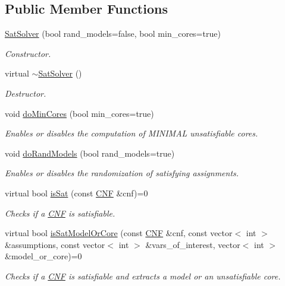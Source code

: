 \subsection*{Public Member Functions}
\begin{DoxyCompactItemize}
\item 
\hyperlink{classSatSolver_a2abb0a2a75d1c3559946956ac19dc89e}{Sat\-Solver} (bool rand\-\_\-models=false, bool min\-\_\-cores=true)
\begin{DoxyCompactList}\small\item\em Constructor. \end{DoxyCompactList}\item 
virtual \hyperlink{classSatSolver_aeefe936d75dbdca120805d650a12e989}{$\sim$\-Sat\-Solver} ()
\begin{DoxyCompactList}\small\item\em Destructor. \end{DoxyCompactList}\item 
void \hyperlink{classSatSolver_a159fc9658709e5aeba2844a09454b2cb}{do\-Min\-Cores} (bool min\-\_\-cores=true)
\begin{DoxyCompactList}\small\item\em Enables or disables the computation of M\-I\-N\-I\-M\-A\-L unsatisfiable cores. \end{DoxyCompactList}\item 
void \hyperlink{classSatSolver_ae229c5e277350710412fce0e867dc566}{do\-Rand\-Models} (bool rand\-\_\-models=true)
\begin{DoxyCompactList}\small\item\em Enables or disables the randomization of satisfying assignments. \end{DoxyCompactList}\item 
virtual bool \hyperlink{classSatSolver_a82f60f60db464fbe5c66a20ad673a573}{is\-Sat} (const \hyperlink{classCNF}{C\-N\-F} \&cnf)=0
\begin{DoxyCompactList}\small\item\em Checks if a \hyperlink{classCNF}{C\-N\-F} is satisfiable. \end{DoxyCompactList}\item 
virtual bool \hyperlink{classSatSolver_ad5cfce08969be5aaf5cd705c12c68818}{is\-Sat\-Model\-Or\-Core} (const \hyperlink{classCNF}{C\-N\-F} \&cnf, const vector$<$ int $>$ \&assumptions, const vector$<$ int $>$ \&vars\-\_\-of\-\_\-interest, vector$<$ int $>$ \&model\-\_\-or\-\_\-core)=0
\begin{DoxyCompactList}\small\item\em Checks if a \hyperlink{classCNF}{C\-N\-F} is satisfiable and extracts a model or an unsatisfiable core. \end{DoxyCompactList}\item 

\end{DoxyCompactItemize}
